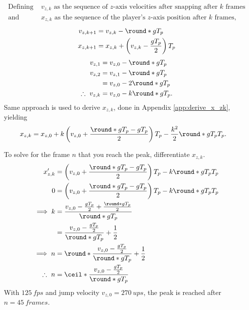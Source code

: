\begin{align*}
\text{Defining }&v_{z,k}\text{ as the sequence of $z$-axis velocities after snapping after $k$ frames}\\
\text{and }&x_{z,k}\text{ as the sequence of the player's $z$-axis position after $k$ frames},
\end{align*}
\begin{align}
\label{eq:v_zk+1}
v_{z,k+1} &= v_{z,k} - \round*{gT_p}\\
\label{eq:x_zk+1}
x_{z,k+1} &= x_{z,k} + \left(v_{z,k} - \frac{gT_p}{2} \right) T_p
\end{align}
\begin{align}
\nonumber
v_{z,1} &= v_{z,0} - \round*{gT_p}\\\nonumber
v_{z,2} &= v_{z,1} - \round*{gT_p}\\\nonumber
&= v_{z,0} - 2\round*{gT_p}\\
\label{eq:v_zk}
\therefore\ v_{z,k} &= v_{z,0} - k\round*{gT_p}.
\end{align}
Same approach is used to derive $x_{z,k}$, done in Appendix \ref{app:derive_x_zk}, yielding
\begin{align}
\label{eq:x_zk}
x_{z,k} &= x_{z,0} + k\left(v_{z,0} + \frac{\round*{gT_p} - gT_p}{2} \right) T_p - \frac{k^2}{2} \round*{gT_p} T_p.
\end{align}

To solve for the frame $n$ that you reach the peak, differentiate $x_{z,k}$.
\begin{align}
\nonumber
x_{z,k}' &= \left(v_{z,0} + \frac{\round*{gT_p} - gT_p}{2} \right) T_p - k\round*{gT_p} T_p\\\nonumber
0 &= \left(v_{z,0} + \frac{\round*{gT_p} - gT_p}{2} \right) T_p - k\round*{gT_p} T_p\\\nonumber
\implies k &= \frac{v_{z,0} - \frac{gT_p}{2} + \frac{\round*{gT_p}}{2}}{\round*{gT_p}}\\\nonumber
&= \frac{v_{z,0} - \frac{gT_p}{2}}{\round*{gT_p}} + \frac{1}{2}\\\nonumber
\implies n &= \round*{\frac{v_{z,0} - \frac{gT_p}{2}}{\round*{gT_p}} + \frac{1}{2}}\\
\therefore\ n &= \ceil*{\frac{v_{z,0} - \frac{gT_p}{2}}{\round*{gT_p}}}
\end{align}
With $\qty{125}{fps}$ and jump velocity $v_{z,0} = \qty{270}{ups}$, the peak is reached after $n = \qty{45}{frames}$.\\

